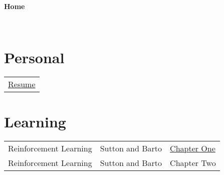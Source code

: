 \documentclass[11pt]{article}
\begin{document}
~
~

\begin{center}
  {
	\fontsize{1.5cm}{1.5cm}
        \textcolor{CalPolyGreen}{\textbf{Home}}
  }

\end{center}

~
~


\section*{\textcolor{CalPolyGreen}{Personal}}
\begin{tabular}{l}
	\href{https://lilcpuppy.github.io/resume.html}{Resume}
\end{tabular}

\section*{\textcolor{CalPolyGreen}{Learning}}
\begin{tabular}{lll}
	Reinforcement Learning	& Sutton and Barto  & \href{https://github.com/LilCPuppy/lilcpuppy.github.io/blob/master/reinforcement_learning_chapter_one.html}{Chapter One}   \\
	Reinforcement Learning	& Sutton and Barto  & Chapter Two   \\
\end{tabular}
\end{document}
